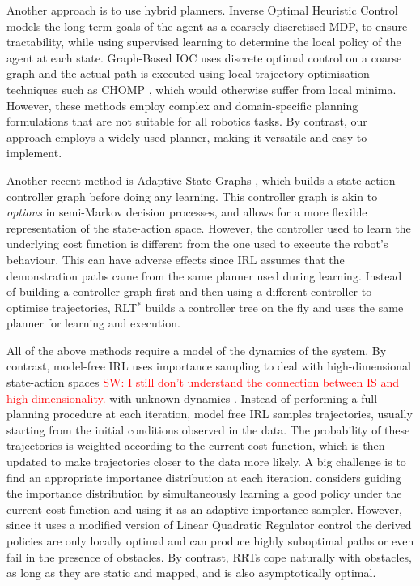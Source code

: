 \documentclass[letterpaper, 10 pt, conference]{ieeeconf}
\newcommand{\sw}[1]{\textcolor{red}{SW: #1}}
\begin{document}
Another approach is to use hybrid planners. Inverse Optimal Heuristic Control \cite{ratliff2009inverse} models the long-term goals of the agent as a coarsely discretised MDP, to ensure tractability, while using supervised learning to determine the local policy of the agent at each state. Graph-Based IOC \cite{byravan2015graph} uses discrete optimal control on a coarse graph and the actual path is executed using local trajectory optimisation techniques such as CHOMP \cite{ratliff2009chomp}, which would otherwise suffer from local minima. However, these methods employ complex and domain-specific planning formulations that are not suitable for all robotics tasks. By contrast, our approach employs a widely used planner, making it versatile and easy to implement. 

Another recent method is Adaptive State Graphs \cite{okallearning}, which builds a state-action controller graph before doing any learning. This controller graph is akin to \emph{options} in semi-Markov decision processes, and allows for a more flexible representation of the state-action space. However, the controller used to learn the underlying cost function is different from the one used to execute the robot's behaviour. This can have adverse effects since IRL  assumes that the demonstration paths came from the same planner used during learning.  Instead of building a controller graph first and then using a different controller to optimise trajectories, RLT$^*$ builds a controller tree on the fly and uses the same planner for learning and execution.

All of the above methods require a model of the dynamics of the system. By contrast, model-free IRL uses importance sampling to deal with high-dimensional state-action spaces \sw{I still don't understand the connection between IS and high-dimensionality.} with unknown dynamics \cite{boularias2011relative,kalakrishnan2013learning}. Instead of performing a full planning procedure at each iteration, model free IRL samples trajectories, usually starting from the initial conditions observed in the data. The probability of these trajectories is weighted according to the current cost function, which is then updated to make trajectories closer to the data more likely. A big challenge is to find an appropriate importance distribution at each iteration. \cite{finn2016guided} considers guiding the importance distribution by simultaneously learning a good policy under the current cost function and using it as an adaptive importance sampler. However, since it uses a modified version of Linear Quadratic Regulator control the derived policies are only locally optimal and can produce highly suboptimal paths or even fail in the presence of obstacles. By contrast, RRTs cope naturally with obstacles, as long as they are static and mapped, and is also asymptotically optimal.
\end{document}
